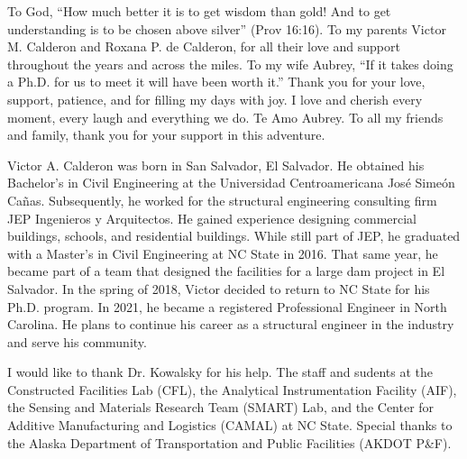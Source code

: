 \maketitlepage

\begin{dedication}
\centering
To God, ``How much better it is to get wisdom than gold! And to get understanding is to be chosen above silver'' (Prov 16:16). 
 \newline To my parents Victor M. Calderon and Roxana P. de Calderon, for all their love and support throughout the years and across the miles. 
 \newline To my wife Aubrey, ``If it takes doing a Ph.D. for us to meet it will have been worth it.'' Thank you for your love, support, patience, and for filling my days with joy. I love and cherish every moment, every laugh and everything we do. Te Amo Aubrey.
 \newline To all my friends and family, thank you for your support in this adventure.
\end{dedication}
%
\begin{biography}
Victor A. Calderon was born in San Salvador, El Salvador. He obtained his Bachelor's in Civil Engineering at the Universidad Centroamericana José Simeón Cañas. Subsequently, he worked for the structural engineering consulting firm JEP Ingenieros y Arquitectos. He gained experience designing commercial buildings, schools, and residential buildings. While still part of JEP, he graduated with a Master's in Civil Engineering at NC State in 2016. That same year, he became part of a team that designed the facilities for a large dam project in El Salvador. In the spring of 2018, Victor decided to return to NC State for his Ph.D. program. In 2021, he became a registered Professional Engineer in North Carolina. He plans to continue his career as a structural engineer in the industry and serve his community.
\end{biography}
%
\begin{acknowledgements}
I would like to thank Dr. Kowalsky for his help. The staff and sudents at the Constructed Facilities Lab (CFL), the Analytical Instrumentation Facility (AIF), the Sensing and Materials Research Team (SMART) Lab, and the Center for Additive Manufacturing and Logistics (CAMAL) at NC State. Special thanks to the Alaska Department of Transportation and Public Facilities (AKDOT P\&F).
\end{acknowledgements}


\thesistableofcontents

\thesislistoftables

\thesislistoffigures
